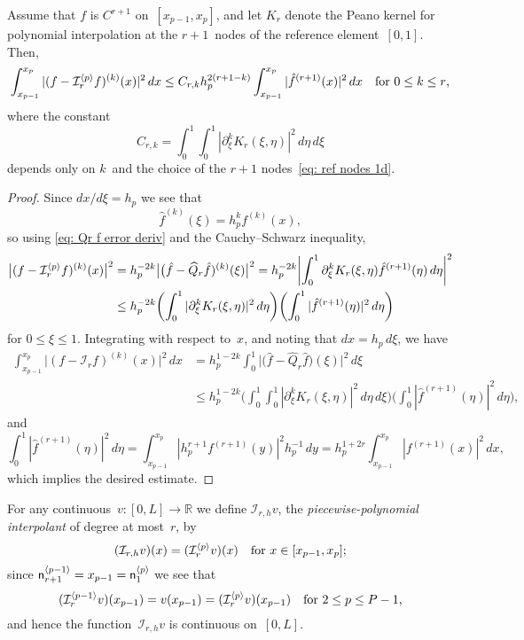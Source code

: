 \begin{theorem}
Assume that $f$ is $C^{r+1}$ on~$[x_{p-1},x_p]$, and let $K_r$ denote the Peano 
kernel for polynomial interpolation at the $r+1$~nodes of the reference 
element~$[0,1]$.  Then,
\[
\int_{x_{p-1}}^{x_p}|(f-\mathcal{I}_r^{\langle p\rangle}f)^{(k)}(x)|^2\,dx
    \le C_{r,k}h_p^{2(r+1-k)}\int_{x_{p-1}}^{x_p}|\hat f^{(r+1)}(x)|^2\,dx
    \quad\text{for $0\le k\le r$,}
\]
where the constant
\[
C_{r,k}=\int_0^1\int_0^1|\partial_\xi^kK_r(\xi,\eta)|^2\,d\eta\,d\xi
\]
depends only on $k$~and the choice of the $r+1$ nodes~\eqref{eq: ref nodes 1d}.
\end{theorem}
\begin{proof}
Since $dx/d\xi=h_p$ we see that
\[
\hat f^{(k)}(\xi)=h_p^k f^{(k)}(x),
\]
so using \eqref{eq: Qr f error deriv} and the Cauchy--Schwarz inequality,
\begin{align*}
\bigl|(f-\mathcal{I}_r^{\langle p\rangle}f)^{(k)}(x)\bigr|^2
    &=h_p^{-2k}\bigl|\bigl(\hat f-\widehat{Q}_r\hat f)^{(k)}(\xi)\bigr|^2
    =h_p^{-2k}\biggl|\int_0^1\partial_\xi^k K_r(\xi,\eta)
        \hat f^{(r+1)}(\eta)\, d\eta\biggr|^2\\
    &\le h_p^{-2k}\biggl(\int_0^1|\partial_\xi^kK_r(\xi,\eta)|^2\,d\eta\biggr)
    \biggl(\int_0^1|\hat f^{(r+1)}(\eta)|^2\,d\eta\biggr)
\end{align*}
for $0\le\xi\le1$.  Integrating with respect to~$x$, and noting that 
$dx=h_p\,d\xi$, we have
\begin{align*}
\int_{x_{p-1}}^{x_p}\bigl|(f-\mathcal{I}_rf)^{(k)}(x)\bigr|^2\,dx
&=h_p^{1-2k}\int_0^1\bigl|\bigl(\hat f-\widehat{Q}_r\hat f)(\xi)\bigr|^2\,d\xi\\
&\le h_p^{1-2k}\biggl(
    \int_0^1\int_0^1|\partial_\xi^kK_r(\xi,\eta)|^2\,d\eta\,d\xi\biggr)
    \biggl(\int_0^1|\hat f^{(r+1)}(\eta)|^2\,d\eta\biggr),
\end{align*}
and 
\[
\int_0^1|\hat f^{(r+1)}(\eta)|^2\,d\eta
    =\int_{x_{p-1}}^{x_p}|h_p^{r+1}f^{(r+1)}(y)|^2h_p^{-1}\,dy
    =h_p^{1+2r}\int_{x_{p-1}}^{x_p}|f^{(r+1)}(x)|^2\,dx,
\]
which implies the desired estimate.
\end{proof}

For any continuous~$v:[0,L]\to\mathbb{R}$ we define $\mathcal{I}_{r,h}v$, the 
\emph{piecewise-polynomial interpolant} of degree at most~$r$, by
\[
(\mathcal{I}_{r,h}v)(x)
    =(\mathcal{I}_r^{\langle p\rangle}v)(x)\quad\text{for $x\in[x_{p-1},x_p]$;}
\]
since $\mathsf{n}^{\langle p-1\rangle}_{r+1}=x_{p-1}=\mathsf{n}^{\langle p\rangle}_1$ we see 
that
\[
(\mathcal{I}_r^{\langle p-1\rangle}v)(x_{p-1})=v(x_{p-1})
    =(\mathcal{I}_r^{\langle p\rangle}v)(x_{p-1})\quad\text{for~$2\le p\le P-1$,}
\]
and hence the function~$\mathcal{I}_{r,h}v$ is continuous on~$[0,L]$.

